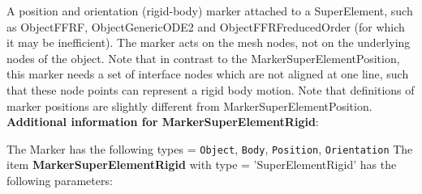 \label{sec:item:MarkerSuperElementRigid}
A position and orientation (rigid-body) marker attached to a SuperElement, such as ObjectFFRF, ObjectGenericODE2 and ObjectFFRFreducedOrder (for which it may be inefficient). The marker acts on the mesh nodes, not on the underlying nodes of the object. Note that in contrast to the MarkerSuperElementPosition, this marker needs a set of interface nodes which are not aligned at one line, such that these node points can represent a rigid body motion. Note that definitions of marker positions are slightly different from MarkerSuperElementPosition.\vspace{12pt}
 \\{\bf Additional information for MarkerSuperElementRigid}:
\bi
  \item The Marker has the following types = \texttt{Object}, \texttt{Body}, \texttt{Position}, \texttt{Orientation}
\ei
\vspace{12pt} \noindent The item {\bf MarkerSuperElementRigid} with type = 'SuperElementRigid' has the following parameters:\vspace{-1cm}\\ 
